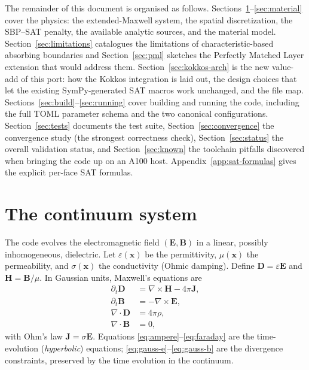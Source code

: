 \documentclass[11pt]{article}
\newcommand{\vE}{\mathbf{E}}
\newcommand{\vB}{\mathbf{B}}
\newcommand{\vD}{\mathbf{D}}
\newcommand{\vH}{\mathbf{H}}
\newcommand{\vJ}{\mathbf{J}}
\newcommand{\vx}{\mathbf{x}}
\newcommand{\eps}{\varepsilon}
\begin{document}
The remainder of this document is organised as follows.
Sections~\ref{sec:physics}--\ref{sec:material} cover the physics:
the extended-Maxwell system, the spatial discretization, the
SBP--SAT penalty, the available analytic sources, and the material
model.  Section~\ref{sec:limitations} catalogues the limitations of
characteristic-based absorbing boundaries and
Section~\ref{sec:pml} sketches the Perfectly Matched Layer extension
that would address them.
Section~\ref{sec:kokkos-arch} is the new value-add of this port:
how the Kokkos integration is laid out, the design choices that let
the existing SymPy-generated SAT macros work unchanged, and the
file map.
Sections~\ref{sec:build}--\ref{sec:running} cover building and
running the code, including the full TOML parameter schema and the
two canonical configurations.
Section~\ref{sec:tests} documents the test suite,
Section~\ref{sec:convergence} the convergence study (the strongest
correctness check), Section~\ref{sec:status} the overall validation
status, and Section~\ref{sec:known} the toolchain pitfalls
discovered when bringing the code up on an A100 host.
Appendix~\ref{app:sat-formulas} gives the explicit per-face SAT
formulas.

\section{The continuum system}
\label{sec:physics}

The code evolves the electromagnetic field $(\vE, \vB)$ in a
linear, possibly inhomogeneous, dielectric.  Let $\eps(\vx)$ be the
permittivity, $\mu(\vx)$ the permeability, and $\sigma(\vx)$ the
conductivity (Ohmic damping).  Define $\vD = \eps \vE$ and
$\vH = \vB / \mu$.  In Gaussian units, Maxwell's equations are
\begin{align}
  \partial_t \vD &= \nabla \times \vH - 4\pi \vJ, \label{eq:ampere}\\
  \partial_t \vB &= -\nabla \times \vE, \label{eq:faraday}\\
  \nabla \cdot \vD &= 4\pi \rho, \label{eq:gauss-e}\\
  \nabla \cdot \vB &= 0, \label{eq:gauss-b}
\end{align}
with Ohm's law $\vJ = \sigma \vE$.  Equations
\eqref{eq:ampere}--\eqref{eq:faraday} are the time-evolution
(\emph{hyperbolic}) equations; \eqref{eq:gauss-e}--\eqref{eq:gauss-b}
are the divergence constraints, preserved by the time evolution in
the continuum.
\end{document}
